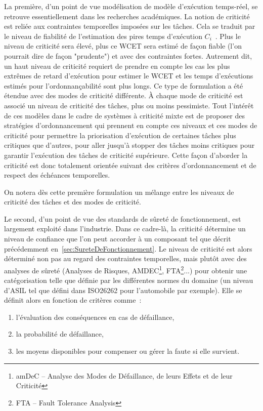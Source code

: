 \documentclass[french, a4paper, 11pt, twoside, pdftex]{StyleThese}
\begin{document}
    La première, d'un point de vue modélisation de modèle d'exécution temps-réel, se retrouve essentiellement dans les recherches académiques. La notion de criticité est reliée aux contraintes temporelles imposées sur les tâches. Cela se traduit par le niveau de fiabilité de l'estimation des pires temps d'exécution $C_i$~\cite{vestal_preemptive_2007}. 
    Plus le niveau de criticité sera élevé, plus ce WCET sera estimé de façon fiable (l'on pourrait dire de façon "prudente") et avec des contraintes fortes. Autrement dit, un haut niveau de criticité requiert de prendre en compte les cas les plus extrêmes de retard d'exécution pour estimer le WCET et les temps d'exécutions estimés pour l'ordonnançabilité sont plus longs. Ce type de formulation a été étendue avec des modes de criticité différente. À chaque mode de criticité est associé un niveau de criticité des tâches, plus ou moins pessimiste.
    Tout l'intérêt de ces modèles  dans le cadre de systèmes à criticité mixte est de proposer des stratégies d'ordonnancement qui prennent en compte ces niveaux et ces modes de criticité pour permettre la priorisation d'exécution de certaines tâches plus critiques que d'autres, pour aller jusqu'à stopper des tâches moins critiques pour garantir l'exécution des tâches de criticité supérieure. Cette façon d'aborder la criticité est donc totalement orientée suivant des critères d'ordonnancement et de respect des échéances temporelles.
    
    On notera dès cette première formulation un mélange entre les niveaux de criticité des tâches et des modes de criticité. 

    Le second, d'un point de vue des standards de sûreté de fonctionnement, est largement exploité dans l'industrie. Dans ce cadre-là, la criticité détermine un niveau de confiance que l'on peut accorder à un composant tel que décrit précédemment en~\autoref{sec:SureteDeFonctionnement}. Le niveau de criticité est alors déterminé non pas au regard des contraintes temporelles, mais plutôt avec des analyses de sûreté (Analyses de Risques, AMDEC\footnote{amDeC -- Analyse des Modes de Défaillance, de leurs Effets et de leur Criticité}, FTA\footnote{FTA -- Fault Tolerance Analysis}...) pour obtenir une catégorisation telle que définie par les différentes normes du domaine (un niveau d'ASIL tel que défini dans ISO26262 pour l'automobile par exemple). Elle se définit alors en fonction de critères comme~: 
\begin{enumerate}[label=\textbf{\alph*)}]
	\item     l'évaluation des conséquences en cas de défaillance, 
	\item     la probabilité de défaillance, 
	\item     les moyens disponibles pour compenser ou gérer la faute si elle survient.
\end{enumerate}
\end{document}
